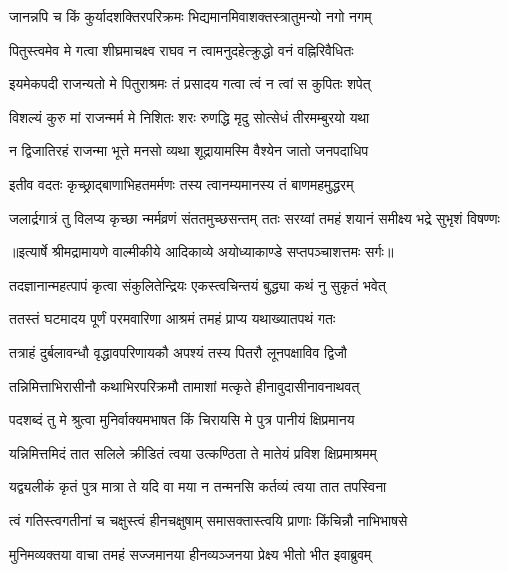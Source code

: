 \twolineshloka
{जानन्नपि च किं कुर्यादशक्तिरपरिक्रमः}
{भिद्यमानमिवाशक्तस्त्रातुमन्यो नगो नगम्} %

\twolineshloka
{पितुस्त्वमेव मे गत्वा शीघ्रमाचक्ष्व राघव}
{न त्वामनुदहेत्क्रुद्धो वनं वह्निरिवैधितः} %

\twolineshloka
{इयमेकपदी राजन्यतो मे पितुराश्रमः}
{तं प्रसादय गत्वा त्वं न त्वां स कुपितः शपेत्} %

\twolineshloka
{विशल्यं कुरु मां राजन्मर्म मे निशितः शरः}
{रुणद्धि मृदु सोत्सेधं तीरमम्बुरयो यथा} %

\twolineshloka
{न द्विजातिरहं राजन्मा भूत्ते मनसो व्यथा}
{शूद्रायामस्मि वैश्येन जातो जनपदाधिप} %

\twolineshloka
{इतीव वदतः कृच्छ्राद्बाणाभिहतमर्मणः}
{तस्य त्वानम्यमानस्य तं बाणमहमुद्धरम्} %

\fourlineindentedshloka
{जलार्द्रगात्रं तु विलप्य कृच्छा}
{न्मर्मव्रणं संततमुच्छसन्तम्}
{ततः सरय्वां तमहं शयानं}
{ समीक्ष्य भद्रे सुभृशं विषण्णः} %


{॥इत्यार्षे श्रीमद्रामायणे वाल्मीकीये आदिकाव्ये अयोध्याकाण्डे सप्तपञ्चाशत्तमः सर्गः॥}


\twolineshloka
{तदज्ञानान्महत्पापं कृत्वा संकुलितेन्द्रियः}
{एकस्त्वचिन्तयं बुद्ध्या कथं नु सुकृतं भवेत्} %

\twolineshloka
{ततस्तं घटमादय पूर्णं परमवारिणा}
{आश्रमं तमहं प्राप्य यथाख्यातपथं गतः} %

\twolineshloka
{तत्राहं दुर्बलावन्धौ वृद्धावपरिणायकौ}
{अपश्यं तस्य पितरौ लूनपक्षाविव द्विजौ} %

\twolineshloka
{तन्निमित्ताभिरासीनौ कथाभिरपरिक्रमौ}
{तामाशां मत्कृते हीनावुदासीनावनाथवत्} %

\twolineshloka
{पदशब्दं तु मे श्रुत्वा मुनिर्वाक्यमभाषत}
{किं चिरायसि मे पुत्र पानीयं क्षिप्रमानय} %

\twolineshloka
{यन्निमित्तमिदं तात सलिले क्रीडितं त्वया}
{उत्कण्ठिता ते मातेयं प्रविश क्षिप्रमाश्रमम्} %

\twolineshloka
{यद्व्यलीकं कृतं पुत्र मात्रा ते यदि वा मया}
{न तन्मनसि कर्तव्यं त्वया तात तपस्विना} %

\twolineshloka
{त्वं गतिस्त्वगतीनां च चक्षुस्त्वं हीनचक्षुषाम्}
{समासक्तास्त्वयि प्राणाः किंचिन्नौ नाभिभाषसे} %

\twolineshloka
{मुनिमव्यक्तया वाचा तमहं सज्जमानया}
{हीनव्यञ्जनया प्रेक्ष्य भीतो भीत इवाब्रुवम्} %

